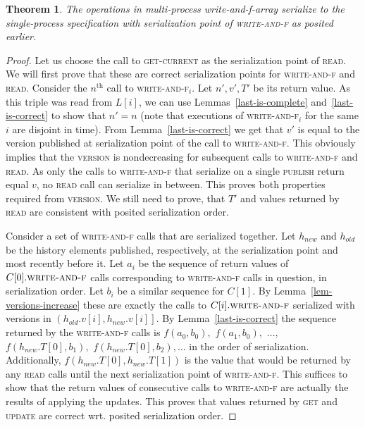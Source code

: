 \documentclass[a4paper,11pt]{article}
\newtheorem{theorem}{Theorem}
\newcommand{\fn}[1]{\textsc{#1}}
\begin{document}
\begin{theorem}
	The operations in multi-process write-and-f-array serialize to the single-process specification with serialization point of \fn{write-and-f} as posited earlier.
\end{theorem}
\begin{proof}
	Let us choose the call to \fn{get-current} as the serialization point of \fn{read}. 
	We will first prove that these are correct serialization points for \fn{write-and-f} and \fn{read}.
	Consider the $n^{\text{th}}$ call to \fn{write-and-f$_i$}. Let $n', v', T'$ be its return value. As this triple was read from $L[i]$, we can use Lemmas~\ref{last-is-complete} and~\ref{last-is-correct} to show that
	$n' = n$ (note that executions of \fn{write-and-f$_i$} for the same $i$ are disjoint in time). From Lemma~\ref{last-is-correct} we get that $v'$ is equal to the
	version published at serialization point of the call to \fn{write-and-f}. This obviously implies that the \fn{version} is nondecreasing for subsequent calls to \fn{write-and-f} and \fn{read}.
	As only the calls to \fn{write-and-f} that serialize on a single \fn{publish} return equal $v$, no \fn{read} call can serialize in between. This proves both properties required from \fn{version}. We still need to prove,
	that $T'$ and values returned by \fn{read} are consistent with posited serialization order.
	
	Consider a set of \fn{write-and-f} calls that are serialized together. Let $h_{new}$ and $h_{old}$ be the history elements published, respectively, at the serialization point and most recently before it. Let $a_i$ be the sequence of return values
	of $C[0].\fn{write-and-f}$ calls corresponding to \fn{write-and-f} calls in question, in serialization order. Let $b_i$ be a similar sequence for $C[1]$. By Lemma~\ref{lem-versions-increase} these are exactly the calls to
$C[i].\fn{write-and-f}$ serialized with versions in $\left(h_{old}.v[i], h_{new}.v[i]\right]$. By Lemma~\ref{last-is-correct} the sequence returned
by the \fn{write-and-f} calls is $f(a_0, b_0), $ $f(a_1, b_0),$ $\ldots, $ $f(h_{new}.T[0], b_1), $ $f(h_{new}.T[0], b_2), \ldots$ in the order of serialization. 
Additionally, $f(h_{new}.T[0], h_{new}.T[1])$ is the value that would be returned by any \fn{read} calls until the next serialization point of \fn{write-and-f}.
This suffices to show that the return values of consecutive calls to \fn{write-and-f} are actually the results of applying the updates.
This proves that values returned by \fn{get} and \fn{update} are correct wrt. posited serialization order.
	

\end{proof}
\end{document}
